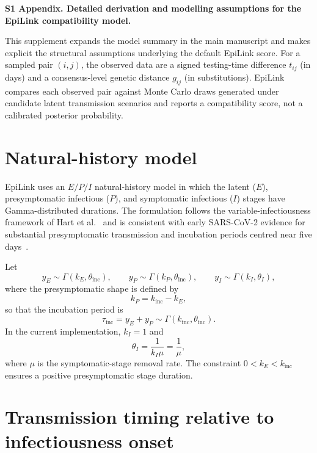 \documentclass[11pt,a4paper]{article}
\begin{document}
\noindent\textbf{\LARGE S1 Appendix. Detailed derivation and modelling assumptions for the EpiLink compatibility model.}

\vspace{1.5em}

\noindent This supplement expands the model summary in the main manuscript and makes explicit the structural assumptions underlying the default EpiLink score. For a sampled pair $(i,j)$, the observed data are a signed testing-time difference $t_{ij}$ (in days) and a consensus-level genetic distance $g_{ij}$ (in substitutions). EpiLink compares each observed pair against Monte Carlo draws generated under candidate latent transmission scenarios and reports a compatibility score, not a calibrated posterior probability.

\tableofcontents
\vspace{1em}

\section{Natural-history model}\label{sec:S1_nathistory}

EpiLink uses an $E/P/I$ natural-history model in which the latent ($E$), presymptomatic infectious ($P$), and symptomatic infectious ($I$) stages have Gamma-distributed durations. The formulation follows the variable-infectiousness framework of Hart et al.~\cite{Hart2021} and is consistent with early SARS-CoV-2 evidence for substantial presymptomatic transmission and incubation periods centred near five days~\cite{He2020, Ferretti2020, Lauer2020, McAloon2020}.

Let
\[
	y_E \sim \Gamma(k_E, \theta_{\mathrm{inc}}), \qquad
	y_P \sim \Gamma(k_P, \theta_{\mathrm{inc}}), \qquad
	y_I \sim \Gamma(k_I, \theta_I),
\]
where the presymptomatic shape is defined by
\[
	k_P = k_{\mathrm{inc}} - k_E,
\]
so that the incubation period is
\[
	\tau_{\mathrm{inc}} = y_E + y_P \sim \Gamma(k_{\mathrm{inc}}, \theta_{\mathrm{inc}}).
\]
In the current implementation, $k_I = 1$ and
\[
	\theta_I = \frac{1}{k_I \mu} = \frac{1}{\mu},
\]
where $\mu$ is the symptomatic-stage removal rate. The constraint $0 < k_E < k_{\mathrm{inc}}$ ensures a positive presymptomatic stage duration.

\section{Transmission timing relative to infectiousness onset}\label{sec:S1_toit}
\end{document}
